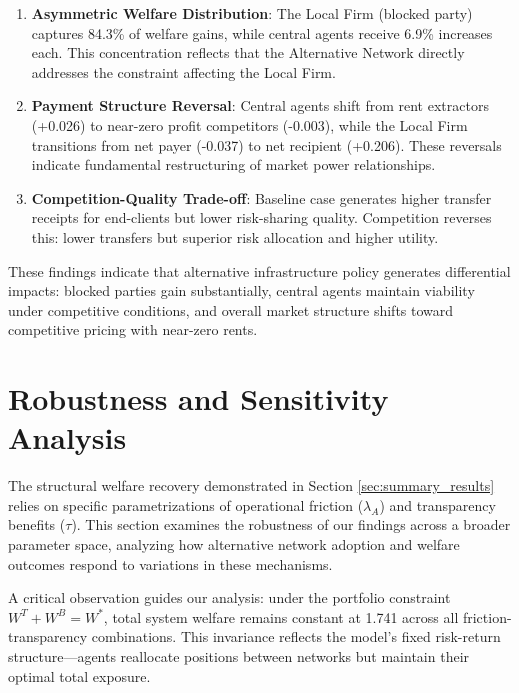 \begin{enumerate}
    \item \textbf{Asymmetric Welfare Distribution}: The Local Firm (blocked party) captures 84.3\% of welfare gains, while central agents receive 6.9\% increases each. This concentration reflects that the Alternative Network directly addresses the constraint affecting the Local Firm.
    
    \item \textbf{Payment Structure Reversal}: Central agents shift from rent extractors (+0.026) to near-zero profit competitors (-0.003), while the Local Firm transitions from net payer (-0.037) to net recipient (+0.206). These reversals indicate fundamental restructuring of market power relationships.
    
    \item \textbf{Competition-Quality Trade-off}: Baseline case generates higher transfer receipts for end-clients but lower risk-sharing quality. Competition reverses this: lower transfers but superior risk allocation and higher utility.
\end{enumerate}

These findings indicate that alternative infrastructure policy generates differential impacts: blocked parties gain substantially, central agents maintain viability under competitive conditions, and overall market structure shifts toward competitive pricing with near-zero rents.


\section{Robustness and Sensitivity Analysis}
\label{sec:sensitivity}

The structural welfare recovery demonstrated in Section \ref{sec:summary_results} 
relies on specific parametrizations of operational friction ($\lambda_A$) and 
transparency benefits ($\tau$). This section examines the robustness of our 
findings across a broader parameter space, analyzing how alternative network adoption and welfare outcomes respond to variations in these mechanisms.

A critical observation guides our analysis: under the portfolio constraint 
$W^T + W^B = W^*$, total system welfare remains constant at 1.741 
across all friction-transparency combinations. This invariance reflects the 
model's fixed risk-return structure—agents reallocate positions between 
networks but maintain their optimal total exposure. 


